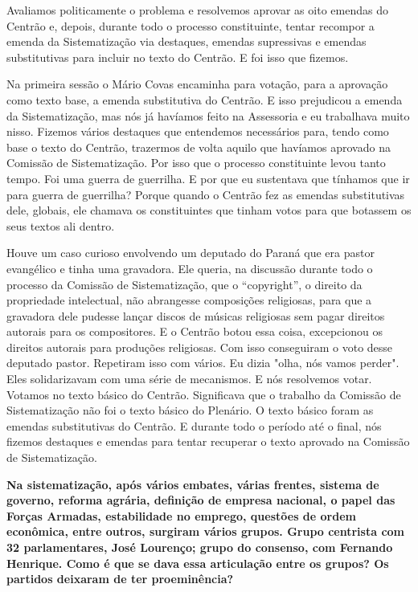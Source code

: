 Avaliamos politicamente o problema e resolvemos aprovar as oito emendas
do Centrão e, depois, durante todo o processo constituinte, tentar
recompor a emenda da Sistematização via destaques, emendas supressivas e
emendas substitutivas para incluir no texto do Centrão. E foi isso que
fizemos.

Na primeira sessão o Mário Covas encaminha para votação, para a
aprovação como texto base, a emenda substitutiva do Centrão. E isso
prejudicou a emenda da Sistematização, mas nós já havíamos feito na
Assessoria e eu trabalhava muito nisso. Fizemos vários destaques que
entendemos necessários para, tendo como base o texto do Centrão,
trazermos de volta aquilo que havíamos aprovado na Comissão de
Sistematização. Por isso que o processo constituinte levou tanto tempo.
Foi uma guerra de guerrilha. E por que eu sustentava que tínhamos que ir
para guerra de guerrilha? Porque quando o Centrão fez as emendas
substitutivas dele, globais, ele chamava os constituintes que tinham
votos para que botassem os seus textos ali dentro.

Houve um caso curioso envolvendo um deputado do Paraná que era pastor
evangélico e tinha uma gravadora. Ele queria, na discussão durante todo
o processo da Comissão de Sistematização, que o ``copyright'', o direito
da propriedade intelectual, não abrangesse composições religiosas, para
que a gravadora dele pudesse lançar discos de músicas religiosas sem
pagar direitos autorais para os compositores. E o Centrão botou essa
coisa, excepcionou os direitos autorais para produções religiosas. Com
isso conseguiram o voto desse deputado pastor. Repetiram isso com
vários. Eu dizia "olha, nós vamos perder". Eles solidarizavam com uma
série de mecanismos. E nós resolvemos votar. Votamos no texto básico do
Centrão. Significava que o trabalho da Comissão de Sistematização não
foi o texto básico do Plenário. O texto básico foram as emendas
substitutivas do Centrão. E durante todo o período até o final, nós
fizemos destaques e emendas para tentar recuperar o texto aprovado na
Comissão de Sistematização.

\textbf{Na sistematização, após vários embates, várias frentes, sistema
de governo, reforma agrária, definição de empresa nacional, o papel das
Forças Armadas, estabilidade no emprego, questões de ordem econômica,
entre outros, surgiram vários grupos. Grupo centrista com 32
parlamentares, José Lourenço; grupo do consenso, com Fernando Henrique.
Como é que se dava essa articulação entre os grupos? Os partidos
deixaram de ter proeminência?}

